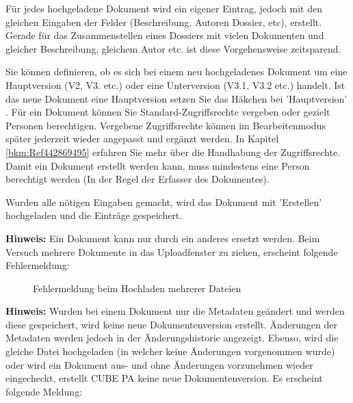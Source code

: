 Für jedes hochgeladene Dokument wird ein eigener Eintrag, jedoch mit den gleichen Eingaben der Felder (Beschreibung, Autoren Dossier, etc), erstellt. Gerade für das Zusammenstellen eines Dossiers mit vielen Dokumenten und gleicher Beschreibung, gleichem Autor etc. ist diese Vorgehensweise zeitsparend. 


Sie können definieren, ob es sich bei einem neu hochgeladenes Dokument um eine Hauptversion (V2, V3. etc.) oder eine Unterversion (V3.1, V3.2 etc.) handelt. Ist das neue Dokument eine Hauptversion setzen Sie das Häkchen bei 'Hauptversion' . Für ein Dokument können Sie Standard-Zugriffsrechte vergeben  oder gezielt Personen berechtigen. Vergebene Zugriffsrechte können im Bearbeitenmodus später jederzeit wieder angepasst und ergänzt werden. In Kapitel \ref{bkm:Ref442869495} erfahren Sie mehr über die Handhabung der Zugriffsrechte. Damit ein Dokument erstellt werden kann, muss mindestens eine Person berechtigt werden (In der Regel der Erfasser des Dokumentes).

Wurden alle nötigen Eingaben gemacht, wird das Dokument mit 'Erstellen'  hochgeladen und die Einträge gespeichert. \newline

\textbf{Hinweis:} Ein Dokument kann nur durch ein anderes ersetzt werden. Beim Versuch mehrere Dokumente in das Uploadfenster zu ziehen, erscheint folgende Fehlermeldung:

\begin{figure}[H]
\caption{Fehlermeldung beim Hochladen mehrerer Dateien}
\end{figure}

\textbf{Hinweis:} Wurden bei einem Dokument nur die Metadaten geändert und werden diese gespeichert, wird keine neue Dokumentenversion erstellt. Änderungen der Metadaten werden jedoch in der Änderungshistorie angezeigt. Ebenso, wird die gleiche Datei hochgeladen (in welcher keine Änderungen vorgenommen wurde) oder wird ein Dokument aus- und ohne Änderungen vorzunehmen wieder eingecheckt, erstellt CUBE PA keine neue Dokumentenversion. Es erscheint folgende Meldung:

